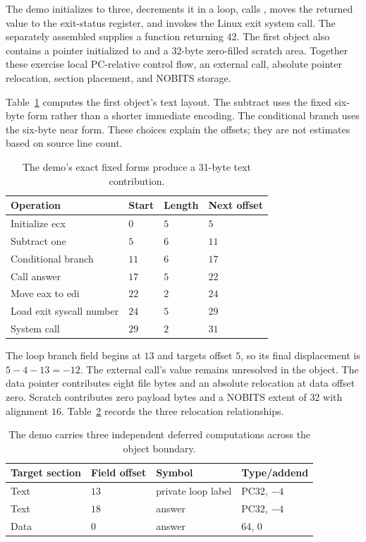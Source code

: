 The demo initializes  to three, decrements it in a loop, calls , moves the returned value to the exit-status register, and invokes the Linux exit system call.
The separately assembled  supplies a function returning $42$.
The first object also contains a pointer initialized to  and a 32-byte zero-filled scratch area.
Together these exercise local PC-relative control flow, an external call, absolute pointer relocation, section placement, and NOBITS storage.

Table~\ref{tab:ch56-offsets} computes the first object's text layout.
The subtract uses the fixed six-byte  form rather than a shorter immediate encoding.
The conditional branch uses the six-byte near form.
These choices explain the offsets; they are not estimates based on source line count.

\begin{table}[htbp]
\caption{The demo's exact fixed forms produce a 31-byte text contribution.}
\label{tab:ch56-offsets}
\centering
\begin{tabular}{llll}
\toprule
Operation & Start & Length & Next offset \\
\midrule
Initialize ecx & $0$ & $5$ & $5$ \\
Subtract one & $5$ & $6$ & $11$ \\
Conditional branch & $11$ & $6$ & $17$ \\
Call answer & $17$ & $5$ & $22$ \\
Move eax to edi & $22$ & $2$ & $24$ \\
Load exit syscall number & $24$ & $5$ & $29$ \\
System call & $29$ & $2$ & $31$ \\
\bottomrule
\end{tabular}
\end{table}

The loop branch field begins at $13$ and targets offset $5$, so its final displacement is $5-4-13=-12$.
The external call's value remains unresolved in the object.
The data pointer contributes eight file bytes and an absolute relocation at data offset zero.
Scratch contributes zero payload bytes and a NOBITS extent of $32$ with alignment $16$.
Table~\ref{tab:ch56-fixups} records the three relocation relationships.

\begin{table}[htbp]
\caption{The demo carries three independent deferred computations across the object boundary.}
\label{tab:ch56-fixups}
\centering
\begin{tabular}{llll}
\toprule
Target section & Field offset & Symbol & Type/addend \\
\midrule
Text & $13$ & private loop label & PC32, $-4$ \\
Text & $18$ & answer & PC32, $-4$ \\
Data & $0$ & answer & 64, $0$ \\
\bottomrule
\end{tabular}
\end{table}

